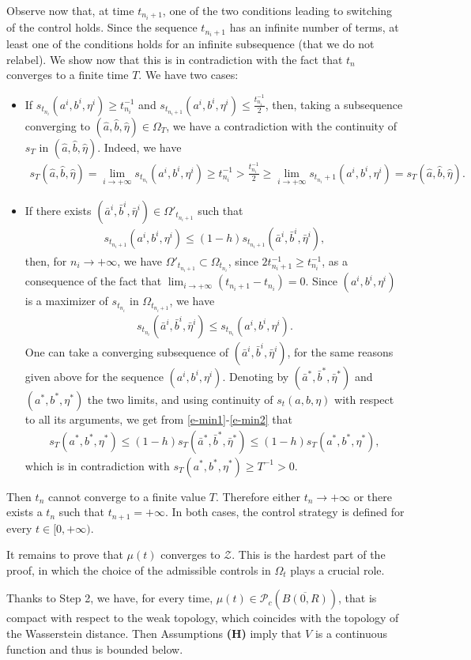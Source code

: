\documentclass{article}
\newcommand{\PR}{\mathcal{P}_c(\overline{B(0,R)})}
\theoremstyle{definition}\newtheorem{remark}{Remark}
\newcommand{\bi}{\begin{itemize}}
\newcommand{\ei}{\end{itemize}}
\renewcommand{\i}{\item}
\newcommand{\bqn}{\begin{eqnarray}}
\newcommand{\eqnn}{\nonumber\end{eqnarray}}
\newcommand{\eqnl}[1]{\label{#1}\end{eqnarray}}
\renewcommand{\r}[1]{\eqref{#1}}
\begin{document}
Observe now that, at time $t_{n_i+1}$, one of the two conditions leading to switching of the control holds. Since the sequence $t_{n_i+1}$ has an infinite number of terms, at least one of the conditions holds for an infinite subsequence (that we do not relabel). We show now that this is in contradiction with the fact that $t_n$ converges to a finite time $T$. We have two cases:
\bi
\i If $s_{t_{n_i}}(a^i,b^i,\eta^i)\geq t_{n_i}^{-1}$ and $s_{t_{n_i+1}}(a^i,b^i,\eta^i)\leq \frac{t_{n_i}^{-1}}2$, then, taking a subsequence converging to $(\hat a, \hat b, \hat \eta)\in\Omega_T$, we have a contradiction with the continuity of $s_T$ in $(\hat a, \hat b, \hat \eta)$. Indeed, we have
\bqn
s_T(\hat a, \hat b, \hat \eta)=\lim_{i\to+\infty} s_{t_{n_i}}(a^i,b^i,\eta^i)\geq t_{n_i}^{-1}>\frac{t_{n_i}^{-1}}2\geq \lim_{i\to+\infty} s_{t_{n_i}+1}(a^i,b^i,\eta^i)=s_T(\hat a, \hat b, \hat \eta).
\eqnn
\i If there exists $(\bar a^i,\bar b^i,\bar \eta^i)\in \Omega'_{t_{n_i+1}}$ such that 
\bqn
s_{t_{n_i+1}}(a^i,b^i,\eta^i)\leq (1-h) s_{t_{n_i+1}} (\bar a^i,\bar b^i,\bar \eta^i),
\eqnl{e-min1}
then, for $n_i\to+\infty$, we have $\Omega'_{t_{n_i+1}}\subset \Omega_{t_{n_i}}$, since $2t_{n_i+1}^{-1}\geq t_{n_i}^{-1}$, as a consequence of the fact that $\lim_{i\to+\infty}(t_{n_i+1}-t_{n_i})=0$. Since $(a^i,b^i,\eta^i)$ is a maximizer of $s_{t_{n_i}}$ in $\Omega_{t_{n_i+1}}$, we have
\bqn
s_{t_{n_i}}(\bar a^i,\bar b^i,\bar \eta^i)\leq 
s_{t_{n_i}}(a^i,b^i,\eta^i).
\eqnl{e-min2}
One can take a converging subsequence of $(\bar a^i,\bar b^i,\bar \eta^i)$, for the same reasons given above for the sequence $(a^i,b^i,\eta^i)$. Denoting by $(\bar a^*,\bar b^*,\bar \eta^*)$ and $(a^*,b^*,\eta^*)$ the two limits, and using continuity of $s_t(a,b,\eta)$ with respect to all its arguments, we get from \r{e-min1}-\r{e-min2} that
\bqn
s_{T}(a^*,b^*,\eta^*)
\leq (1-h) s_{T} (\bar a^*,\bar b^*,\bar \eta^*)
\leq (1-h) s_{T}(a^*,b^*,\eta^*),
\eqnn
which is in contradiction with $s_{T}(a^*,b^*,\eta^*)\geq T^{-1}>0$.
\ei
Then $t_n$ cannot converge to a finite value $T$. Therefore either $t_n\to+\infty$ or there exists a $t_n$ such that $t_{n+1}=+\infty$. In both cases, the control strategy is defined for every $t\in[0,+\infty)$.

\medskip

It remains to prove that $\mu(t)$ converges to $\mathcal{Z}$. This is the hardest part of the proof, in which the choice of the admissible controls in $\Omega_t$ plays a crucial role.

Thanks to Step 2, we have, for every time, $\mu(t)\in \PR$, that is compact with respect to the weak topology, which coincides with the topology of the Wasserstein distance. Then Assumptions {\bf (H)} imply that $V$ is a continuous function and thus is bounded below.
\end{document}
